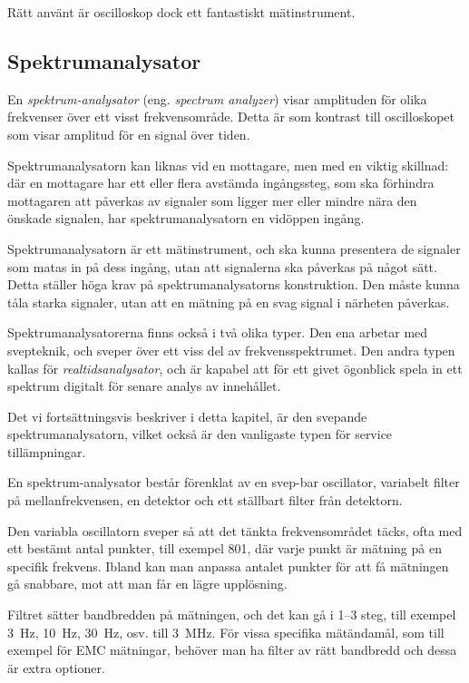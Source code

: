 Rätt använt är oscilloskop dock ett fantastiskt mätinstrument.

\subsection{Spektrumanalysator}
\label{spektrumanalysator}

En \emph{spektrum-analysator} (eng. \emph{spectrum analyzer}) visar amplituden
för olika frekvenser över ett visst frekvensområde.
Detta är som kontrast till oscilloskopet som visar amplitud för en signal
över tiden.

Spektrumanalysatorn kan liknas vid en mottagare, men med en viktig skillnad:
där en mottagare har ett eller flera avstämda ingångssteg, som ska förhindra
mottagaren att påverkas av signaler som ligger mer eller mindre nära den
önskade signalen, har spektrumanalysatorn en vidöppen ingång.

Spektrumanalysatorn är ett mätinstrument, och ska kunna presentera de
signaler som matas in på dess ingång, utan att signalerna ska påverkas på
något sätt.
Detta ställer höga krav på spektrumanalysatorns konstruktion.
Den måste kunna tåla starka signaler, utan att en mätning på en svag signal i
närheten påverkas.

Spektrumanalysatorerna finns också i två olika typer.
Den ena arbetar med svepteknik, och sveper över ett viss del av
frekvensspektrumet.
Den andra typen kallas för \emph{realtidsanalysator}, och är kapabel att för
ett givet ögonblick spela in ett spektrum digitalt för senare analys av
innehållet.

Det vi fortsättningsvis beskriver i detta kapitel, är den svepande
spektrumanalysatorn, vilket också är den vanligaste typen för
service tillämpningar.

En spektrum-analysator består förenklat av en svep-bar oscillator,
variabelt filter på mellanfrekvensen, en detektor och ett ställbart
filter från detektorn.

Den variabla oscillatorn sveper så att det tänkta frekvensområdet täcks, ofta
med ett bestämt antal punkter, till exempel 801, där varje punkt är mätning på
en specifik frekvens.
Ibland kan man anpassa antalet punkter för att få mätningen gå snabbare,
mot att man får en lägre upplösning.

Filtret sätter bandbredden på mätningen, och det kan gå i 1--3 steg, till
exempel \qty{3}{\hertz}, \qty{10}{\hertz}, \qty{30}{\hertz}, osv. till
\qty{3}{\mega\hertz}.
För vissa specifika mätändamål, som till exempel för EMC mätningar, behöver man
ha filter av rätt bandbredd och dessa är extra optioner.

